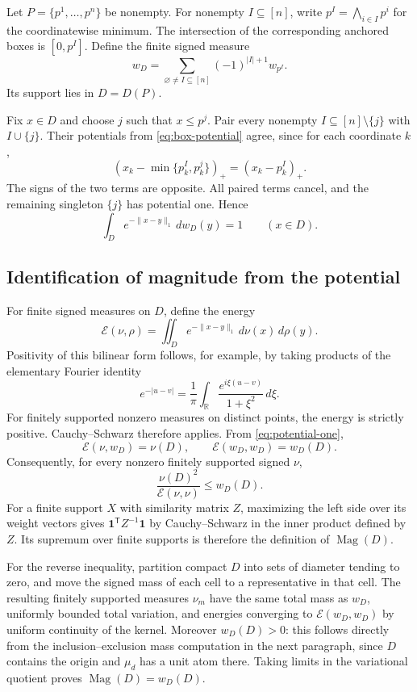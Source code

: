 \documentclass[12pt,a4paper]{article}
\theoremstyle{definition}
\theoremstyle{remark}
\newcommand{\R}{\mathbb R}
\newcommand{\Mag}{\operatorname{Mag}}
\newcommand{\one}{\mathbf 1}
\begin{document}
Let $P=\{p^1,\ldots,p^n\}$ be nonempty. For nonempty
$I\subseteq[n]$, write $p^I=\bigwedge_{i\in I}p^i$ for the coordinatewise
minimum. The intersection of the corresponding anchored boxes is
$[0,p^I]$. Define the finite signed measure
\begin{equation}
 w_D=\sum_{\varnothing\ne I\subseteq[n]}(-1)^{|I|+1}w_{p^I}.
 \label{eq:union-weight}
\end{equation}
Its support lies in $D=D(P)$.

Fix $x\in D$ and choose $j$ such that $x\le p^j$. Pair every nonempty
$I\subseteq[n]\setminus\{j\}$ with $I\cup\{j\}$. Their potentials
from \eqref{eq:box-potential} agree, since for each coordinate $k$,
\[
 (x_k-\min\{p^I_k,p^j_k\})_+=(x_k-p^I_k)_+.
\]
The signs of the two terms are opposite. All paired terms cancel,
and the remaining singleton $\{j\}$ has potential one. Hence
\begin{equation}
 \int_D e^{-\|x-y\|_1}\,dw_D(y)=1\qquad(x\in D).
 \label{eq:potential-one}
\end{equation}

\subsection{Identification of magnitude from the potential}

For finite signed measures on $D$, define the energy
\[
 \mathcal E(\nu,\rho)=\iint_D e^{-\|x-y\|_1}\,d\nu(x)\,d\rho(y).
\]
Positivity of this bilinear form follows, for example, by taking
products of the elementary Fourier identity
\[
 e^{-|u-v|}=\frac1\pi\int_{\R}
                  \frac{e^{i\xi(u-v)}}{1+\xi^2}\,d\xi.
\]
For finitely supported nonzero measures on distinct points, the energy
is strictly positive. Cauchy--Schwarz therefore applies. From
\eqref{eq:potential-one},
\[
 \mathcal E(\nu,w_D)=\nu(D),\qquad
 \mathcal E(w_D,w_D)=w_D(D).
\]
Consequently, for every nonzero finitely supported signed $\nu$,
\begin{equation}
 \frac{\nu(D)^2}{\mathcal E(\nu,\nu)}\le w_D(D).
 \label{eq:energy-bound}
\end{equation}
For a finite support $X$ with similarity matrix $Z$, maximizing the
left side over its weight vectors gives
$\one^{\mathsf T}Z^{-1}\one$ by Cauchy--Schwarz in the inner product
defined by $Z$. Its supremum over finite supports is therefore the
definition of $\Mag(D)$.

For the reverse inequality, partition compact $D$ into sets of diameter
tending to zero, and move the signed mass of each cell to a
representative in that cell. The resulting finitely supported measures
$\nu_m$ have the same total mass as $w_D$, uniformly bounded total
variation, and energies converging to $\mathcal E(w_D,w_D)$ by uniform
continuity of the kernel. Moreover $w_D(D)>0$: this follows directly
from the inclusion--exclusion mass computation in the next paragraph,
since $D$ contains the origin and $\mu_d$ has a unit atom there. Taking
limits in the variational quotient proves $\Mag(D)=w_D(D)$.
\end{document}
